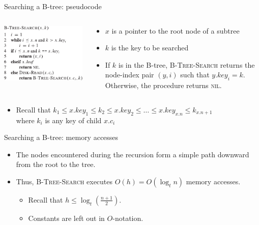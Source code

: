 \documentclass[11pt,t]{beamer}
\begin{document}
	\begin{frame}{Searching a B-tree: pseudocode}
		\begin{columns}[c]
			\begin{column}{.5\textwidth}
				\includegraphics[width=.9\columnwidth]{images/search}
			\end{column}
			\begin{column}{.5\textwidth}
				\pause\begin{itemize}[<+->]
					\item \(x\) is a pointer to the root node of a subtree
					\item \(k\) is the key to be searched
					\item If \(k\) is in the B-tree, \textsc{B-Tree-Search} returns the node-index pair \((y,i)\) such that \(y.key_i=k\). Otherwise, the procedure returns \textsc{nil}.
				\end{itemize}
			\end{column}
		\end{columns}
		\vspace{0.4cm}
		\begin{itemize}[<+->]
			\item Recall that \(k_1 \leq x.key_1 \leq k_2 \leq x.key_2 \leq \ldots \leq x.key_{x.n} \leq k_{x.n+1}\) \\ where \(k_i\) is any key of child \(x.c_i\)
		\end{itemize}
	\end{frame}

	\begin{frame}{Searching a B-tree: memory accesses}
		\begin{itemize}[<+->]
			\item The nodes encountered during the recursion form a simple path downward from the root to the tree.
			\item Thus, \textsc{B-Tree-Search} executes \(O(h) = O(\log_t n)\) memory accesses.
			\begin{itemize}[<+->]
				\item Recall that \(h \leq \log_t\left( \frac{n+1}{2}\right) \).
				\item Constants are left out in \(O\)-notation.
			\end{itemize}
		\end{itemize}
	\end{frame}
\end{document}
